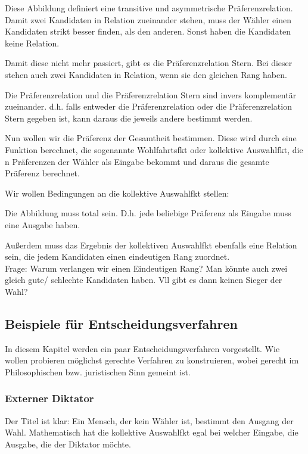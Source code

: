 \documentclass[]{article}
\begin{document}
Diese Abbildung definiert eine transitive und asymmetrische Präferenzrelation. Damit zwei Kandidaten in Relation zueinander stehen, muss der Wähler einen Kandidaten strikt besser finden, als den anderen. Sonst haben die Kandidaten keine Relation. 

Damit diese nicht mehr passiert, gibt es die Präferenzrelation Stern. Bei dieser stehen auch zwei Kandidaten in Relation, wenn sie den gleichen Rang haben. 

Die Präferenzrelation und die Präferenzrelation Stern sind invers komplementär zueinander. d.h. falls entweder die Präferenzrelation oder die Präferenzrelation Stern gegeben ist, kann daraus die jeweils andere bestimmt werden. 

Nun wollen wir die Präferenz der Gesamtheit bestimmen. Diese wird durch eine Funktion berechnet, die sogenannte Wohlfahrtsfkt oder kollektive Auswahlfkt, die n Präferenzen der Wähler als Eingabe bekommt und daraus die gesamte Präferenz berechnet. 

Wir wollen Bedingungen an die kollektive Auswahlfkt stellen: 

Die Abbildung muss total sein. D.h. jede beliebige Präferenz als Eingabe muss eine Ausgabe haben. 

Außerdem muss das Ergebnis der kollektiven Auswahlfkt ebenfalls eine Relation sein, die jedem Kandidaten einen eindeutigen Rang zuordnet.  \\ 

Frage: Warum verlangen wir einen Eindeutigen Rang? Man könnte auch zwei gleich gute/ schlechte Kandidaten haben. Vll gibt es dann keinen Sieger der Wahl? 

\subsection{Beispiele für Entscheidungsverfahren}

In diesem Kapitel werden ein paar Entscheidungsverfahren vorgestellt. Wie wollen probieren möglichst gerechte Verfahren zu konstruieren, wobei gerecht im Philosophischen bzw. juristischen Sinn gemeint ist. 

\subsubsection*{Externer Diktator}

Der Titel ist klar: Ein Mensch, der kein Wähler ist, bestimmt den Ausgang der Wahl. Mathematisch hat die kollektive Auswahlfkt egal bei welcher Eingabe, die Ausgabe, die der Diktator möchte. 
\end{document}
